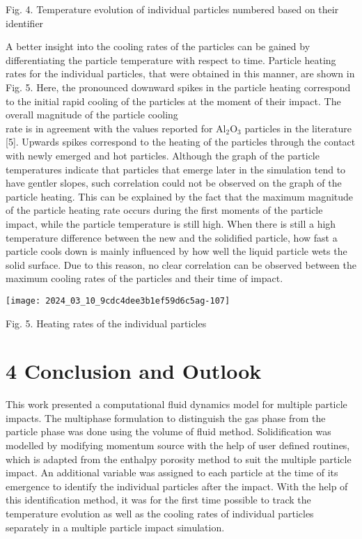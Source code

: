 \documentclass[10pt]{article}
\begin{document}
Fig. 4. Temperature evolution of individual particles numbered based on their identifier

A better insight into the cooling rates of the particles can be gained by differentiating the particle temperature with respect to time. Particle heating rates for the individual particles, that were obtained in this manner, are shown in Fig. 5. Here, the pronounced downward spikes in the particle heating correspond to the initial rapid cooling of the particles at the moment of their impact. The overall magnitude of the particle cooling\\
rate is in agreement with the values reported for $\mathrm{Al}_{2} \mathrm{O}_{3}$ particles in the literature [5]. Upwards spikes correspond to the heating of the particles through the contact with newly emerged and hot particles. Although the graph of the particle temperatures indicate that particles that emerge later in the simulation tend to have gentler slopes, such correlation could not be observed on the graph of the particle heating. This can be explained by the fact that the maximum magnitude of the particle heating rate occurs during the first moments of the particle impact, while the particle temperature is still high. When there is still a high temperature difference between the new and the solidified particle, how fast a particle cools down is mainly influenced by how well the liquid particle wets the solid surface. Due to this reason, no clear correlation can be observed between the maximum cooling rates of the particles and their time of impact.

\begin{center}
\texttt{[image: 2024\_03\_10\_9cdc4dee3b1ef59d6c5ag-107]}
\end{center}

Fig. 5. Heating rates of the individual particles

\section*{4 Conclusion and Outlook}
This work presented a computational fluid dynamics model for multiple particle impacts. The multiphase formulation to distinguish the gas phase from the particle phase was done using the volume of fluid method. Solidification was modelled by modifying momentum source with the help of user defined routines, which is adapted from the enthalpy porosity method to suit the multiple particle impact. An additional variable was assigned to each particle at the time of its emergence to identify the individual particles after the impact. With the help of this identification method, it was for the first time possible to track the temperature evolution as well as the cooling rates of individual particles separately in a multiple particle impact simulation.
\end{document}
